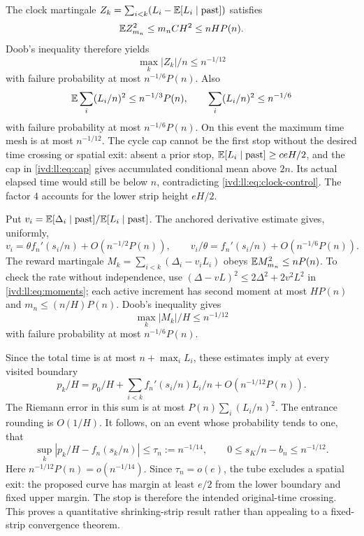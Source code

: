 \documentclass[11pt,letterpaper]{article}
\theoremstyle{remark}\newtheorem{remark}[theorem]{Remark}
\numberwithin{equation}{section}
\begin{document}
The clock martingale $Z_k=\sum_{i<k}(L_i-\mathbb E[L_i\mid\text{past}])$
satisfies
\[
 \mathbb E Z_{m_n}^2\le m_n C H^2\le nH P(n).
\]
Doob's inequality therefore yields
\begin{equation}\label{ivd:ll:eq:clock-control}
 \max_k|Z_k|/n\le n^{-1/12}
\end{equation}
with failure probability at most $n^{-1/6}P(n)$. Also
\begin{equation}\label{ivd:ll:eq:mesh}
 \mathbb E\sum_i(L_i/n)^2\le n^{-1/3}P(n),\qquad
 \sum_i(L_i/n)^2\le n^{-1/6}
\end{equation}
with failure probability at most $n^{-1/6}P(n)$. On this event
the maximum time mesh is at most $n^{-1/12}$.
The cycle cap cannot be the first stop without the desired time
crossing or spatial exit: absent a prior stop,
$\mathbb E[L_i\mid\text{past}]\ge ceH/2$, and the cap in
\eqref{ivd:ll:eq:cap} gives accumulated conditional mean above $2n$.
Its actual elapsed time would still be below $n$, contradicting
\eqref{ivd:ll:eq:clock-control}. The factor $4$ accounts for the
lower strip height $eH/2$.

Put $v_i=\mathbb E[\Delta_i\mid\text{past}]/\mathbb E[L_i\mid\text{past}]$.
The anchored derivative estimate gives, uniformly,
\begin{equation}\label{ivd:ll:eq:physical-drift}
 v_i=\theta f_n'(s_i/n)+O(n^{-1/2}P(n)),\qquad
 v_i/\theta=f_n'(s_i/n)+O(n^{-1/6}P(n)).
\end{equation}
The reward martingale $M_k=\sum_{i<k}(\Delta_i-v_iL_i)$ obeys
$\mathbb E M_{m_n}^2\le nP(n)$. To check the rate without independence,
use $(\Delta-vL)^2\le2\Delta^2+2v^2L^2$ in
\eqref{ivd:ll:eq:moments}; each active increment has second moment at
most $HP(n)$ and $m_n\le(n/H)P(n)$.
Doob's inequality gives
\begin{equation}\label{ivd:ll:eq:reward-control}
 \max_k|M_k|/H\le n^{-1/12}
\end{equation}
with failure probability at most $n^{-1/6}P(n)$.

Since the total time is at most $n+\max_iL_i$, these estimates
imply at every visited boundary
\begin{equation}\label{ivd:ll:eq:path-sum}
 p_k/H=p_0/H+\sum_{i<k} f_n'(s_i/n)L_i/n
                     +O(n^{-1/12}P(n)).
\end{equation}
The Riemann error in this sum is at most
$P(n)\sum_i(L_i/n)^2$. The entrance rounding is $O(1/H)$.
It follows, on an event whose probability tends to one, that
\begin{equation}\label{ivd:ll:eq:tube}
 \sup_k|p_k/H-f_n(s_k/n)|\le\tau_n:=n^{-1/14},\qquad
 0\le s_K/n-b_n\le n^{-1/12}.
\end{equation}
Here $n^{-1/12}P(n)=o(n^{-1/14})$. Since $\tau_n=o(e)$,
the tube excludes a spatial exit: the proposed curve has margin
at least $e/2$ from the lower boundary and fixed upper margin.
The stop is therefore the intended original-time crossing.
This proves a quantitative shrinking-strip result rather than
appealing to a fixed-strip convergence theorem.
\end{document}
